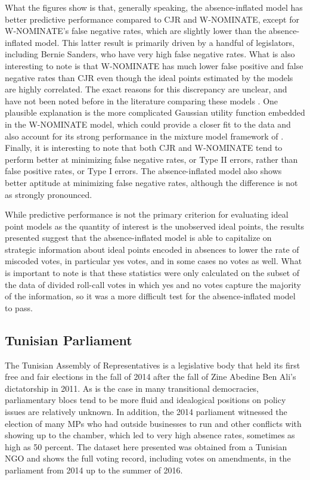 What the figures show is that, generally speaking, the absence-inflated model has better predictive performance compared to CJR and W-NOMINATE, except for W-NOMINATE's false negative rates, which are slightly lower than the absence-inflated model. This latter result is primarily driven by a handful of legislators, including Bernie Sanders, who have very high false negative rates. What is also interesting to note is that W-NOMINATE has much lower false positive and false negative rates than CJR even though the ideal points estimated by the models are highly correlated. The exact reasons for this discrepancy are unclear, and have not been noted before in the literature comparing these models \parencite{carroll2009,jackman2004,carroll2013}. One plausible explanation is the more complicated Gaussian utility function embedded in the W-NOMINATE model, which could provide a closer fit to the data and also account for its strong performance in the mixture model framework of \textcite{carroll2013}. Finally, it is interesting to note that both CJR and W-NOMINATE tend to perform better at minimizing false negative rates, or Type II errors, rather than false positive rates, or Type I errors. The absence-inflated model also shows better aptitude at minimizing false negative rates, although the difference is not as strongly pronounced.

While predictive performance is not the primary criterion for evaluating ideal point models as the quantity of interest is the unobserved ideal points, the results presented suggest that the absence-inflated model is able to capitalize on strategic information about ideal points encoded in absences to lower the rate of miscoded votes, in particular yes votes, and in some cases no votes as well. What is important to note is that these statistics were only calculated on the subset of the data of divided roll-call votes in which yes and no votes capture the majority of the information, so it was a more difficult test for the absence-inflated model to pass. 




	
	\subsection*{Tunisian Parliament}
	
	The Tunisian Assembly of Representatives is a legislative body that held its first free and fair elections in the fall of 2014 after the fall of Zine Abedine Ben Ali's dictatorship in 2011. As is the case in many transitional democracies, parliamentary blocs tend to be more fluid and idealogical positions on policy issues are relatively unknown. In addition, the 2014 parliament witnessed the election of many MPs who had outside businesses to run and other conflicts with showing up to the chamber, which led to very high absence rates, sometimes as high as 50 percent. The dataset here presented was obtained from a Tunisian NGO and shows the full voting record, including votes on amendments, in the parliament from 2014 up to the summer of 2016. 
	
